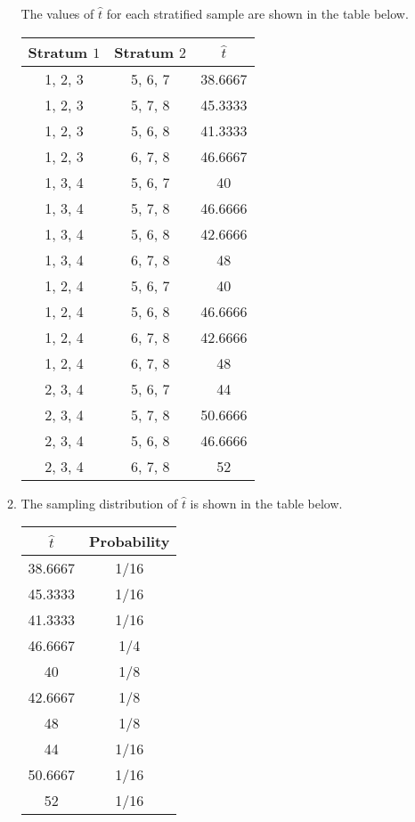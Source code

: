 \documentclass[12pt]{article}\usepackage[]{graphicx}\usepackage[]{color}
\begin{document}
\begin{doublespacing}
\begin{enumerate}
\begin{enumerate}
The values of $\hat{t}$ for each stratified sample are shown in the table below.
\begin{table}[H]
\centering
\begin{tabular}{c|c|c}
Stratum $1$ & Stratum $2$ & $\hat{t}$ \\
\hline
{1, 2, 3} & {5, 6, 7} & 38.6667 \\
{1, 2, 3} & {5, 7, 8} & 45.3333 \\
{1, 2, 3} & {5, 6, 8} & 41.3333 \\
{1, 2, 3} & {6, 7, 8} & 46.6667 \\
{1, 3, 4} & {5, 6, 7} & 40 \\
{1, 3, 4} & {5, 7, 8} & 46.6666 \\
{1, 3, 4} & {5, 6, 8} & 42.6666 \\
{1, 3, 4} & {6, 7, 8} & 48 \\
{1, 2, 4} & {5, 6, 7} & 40 \\
{1, 2, 4} & {5, 6, 8} & 46.6666 \\
{1, 2, 4} & {6, 7, 8} & 42.6666 \\
{1, 2, 4} & {6, 7, 8} & 48 \\
{2, 3, 4} & {5, 6, 7} & 44 \\
{2, 3, 4} & {5, 7, 8} & 50.6666 \\
{2, 3, 4} & {5, 6, 8} & 46.6666 \\
{2, 3, 4} & {6, 7, 8} & 52 \\
\hline
\end{tabular}
\end{table}


\item The sampling distribution of $\hat{t}$ is shown in the table below.
\begin{table}[H]
\centering
\begin{tabular}{c|c}
$\hat{t}$ & Probability \\
\hline
38.6667 & 1/16 \\
45.3333 & 1/16 \\
41.3333 & 1/16 \\
46.6667 & 1/4 \\
40 & 1/8 \\
42.6667 & 1/8 \\
48 & 1/8 \\
44 & 1/16 \\
50.6667 & 1/16 \\
52 & 1/16 \\
\hline
\end{tabular}
\end{table}


\end{enumerate}
\end{enumerate}
\end{doublespacing}
\end{document}
